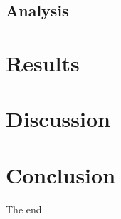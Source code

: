 \documentclass{article}
\begin{document}
\subsection{Analysis}


\section{Results}



\section{Discussion}



\section{Conclusion}

The end.

\printbibliography

\appendix
\end{document}
